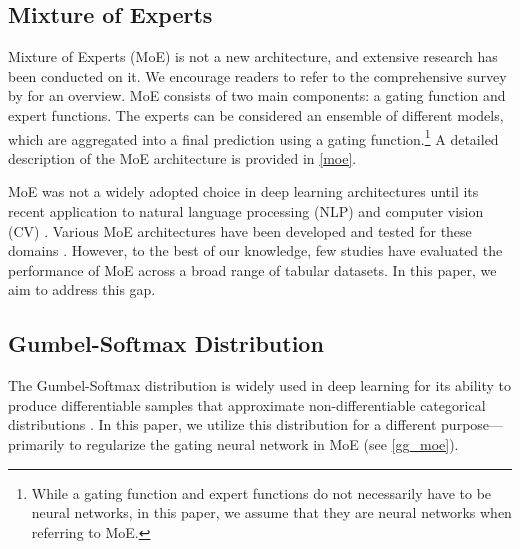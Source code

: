 \subsection{Mixture of Experts}
Mixture of Experts (MoE) is not a new architecture, and extensive research has been conducted on it. We encourage readers to refer to the comprehensive survey by \cite{yuksel2012twenty} for an overview. MoE consists of two main components: a gating function and expert functions. The experts can be considered an ensemble of different models, which are aggregated into a final prediction using a gating function.\footnote{While a gating function and expert functions do not necessarily have to be neural networks, in this paper, we assume that they are neural networks when referring to MoE.} A detailed description of the MoE architecture is provided in \cref{moe}.

MoE was not a widely adopted choice in deep learning architectures until its recent application to natural language processing (NLP) \cite{du2022glam} and computer vision (CV) \cite{puigcerver2023sparse,riquelme2021scaling}. Various MoE architectures have been developed and tested for these domains \cite{fedus2022review}. However, to the best of our knowledge, few studies have evaluated the performance of MoE across a broad range of tabular datasets. In this paper, we aim to address this gap.

\subsection{Gumbel-Softmax Distribution}
The Gumbel-Softmax distribution is widely used in deep learning for its ability to produce differentiable samples that approximate non-differentiable categorical distributions \cite{jang2016categorical}. In this paper, we utilize this distribution for a different purpose—primarily to regularize the gating neural network in MoE (see \cref{gg_moe}).